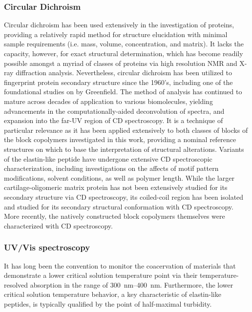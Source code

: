 \begin{refsection}
\subsubsection{Circular Dichroism} Circular dichroism has been used extensively
in the investigation of proteins, providing a relatively rapid method for
structure elucidation with minimal sample requirements (i.e. mass, volume,
concentration, and matrix). It lacks the capacity, however, for exact structural
determination, which has become readily possible amongst a myriad of classes of
proteins via high resolution NMR and X-ray diffraction analysis.\cite{Adler1973}
Nevertheless, circular dichroism has been utilized to fingerprint protein
secondary structure since the 1960's, including one of the foundational studies
on  by Greenfield.\cite{Greenfield1969} The method
of analysis has continued to mature across decades of application to various
biomolecules, yielding advancements in the computationally-aided deconvolution
of
spectra,\cite{Andrade1993,Sreerama1993,Manavalan1987,Provencher1981,Johnson1999}
and expansion into the far-UV region of CD
spectroscopy.\cite{Brahms1980,Wallace2009,Miles2006} It is a technique of
particular relevance as it has been applied extensively to both classes of
blocks of the block copolymers investigated in this work, providing a nominal
reference structures on which to base the interpretation of structural
alterations. Variants of the elastin-like peptide have undergone extensive CD
spectroscopic characterization, including investigations on the affects of motif
pattern modifications,\cite{Nuhn2008,Kim2005} solvent conditions,\cite{URRY1974}
as well as polymer length.\cite{Nuhn2008,Urry1986,Reiersen1998} While the larger
cartilage-oligomeric matrix protein has not been extensively studied for its
secondary structure via CD spectroscopy, its coiled-coil region has been
isolated and studied for its secondary structural conformation with CD
spectroscopy.\cite{Gunasekar2009,Terskikh1997} More recently, the natively
constructed block copolymers themselves were characterized with CD
spectroscopy.\cite{Haghpanah2009}

\subsubsection{UV/Vis spectroscopy}
It has long been the convention to monitor the coacervation of materials that
demonstrate a lower critical
solution temperature point via their temperature-resolved absorption in the
range of \SIrange{300}{400}{\nm}. Furthermore, the lower critical solution
temperature behavior, a key characteristic of elastin-like peptides,
is typically qualified by the point of half-maximal turbidity.\cite{Urry1993}


\end{refsection}
